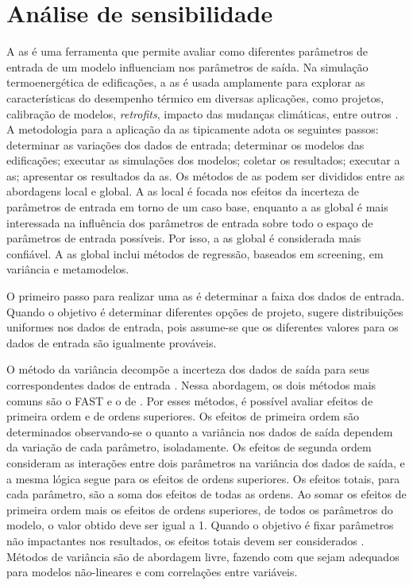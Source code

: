 \documentclass[brazil,hardcopy,openany]{ufscthesis} %
\begin{document}
\section{Análise de sensibilidade}

A \acrfull{as} é uma ferramenta que permite avaliar como diferentes parâmetros de entrada de um modelo influenciam nos parâmetros de saída. Na simulação termoenergética de edificações, a \acrshort{as} é usada amplamente para explorar as características do desempenho térmico em diversas aplicações, como projetos, calibração de modelos, \textit{retrofits}, impacto das mudanças climáticas, entre outros \cite{Tian2013a}. A metodologia para a aplicação da \acrshort{as} tipicamente adota os seguintes passos: determinar as variações dos dados de entrada; determinar os modelos das edificações; executar as simulações dos modelos; coletar os resultados; executar a \acrshort{as}; apresentar os resultados da \acrshort{as}. Os métodos de \acrshort{as} podem ser divididos entre as abordagens local e global. A \acrshort{as} local é focada nos efeitos da incerteza de parâmetros de entrada em torno de um caso base, enquanto a \acrshort{as} global é mais interessada na influência dos parâmetros de entrada sobre todo o espaço de parâmetros de entrada possíveis. Por isso, a \acrshort{as} global é considerada mais confiável. A \acrshort{as} global inclui métodos de regressão, baseados em screening, em variância e metamodelos.

O primeiro passo para realizar uma \acrshort{as} é determinar a faixa dos dados de entrada. Quando o objetivo é determinar diferentes opções de projeto,   sugere distribuições uniformes nos dados de entrada, pois assume-se que os diferentes valores para os dados de entrada são igualmente prováveis.

O método da variância decompõe a incerteza dos dados de saída para seus correspondentes dados de entrada  \cite{Tian2013a}. Nessa abordagem, os dois métodos mais comuns são o FAST \cite{Saltelli2004} e o de . 
Por esses métodos, é possível avaliar efeitos de primeira ordem e de ordens superiores.
Os efeitos de primeira ordem são determinados observando-se o quanto a variância nos dados de saída dependem da variação de cada parâmetro, isoladamente.
Os efeitos de segunda ordem consideram as interações entre dois parâmetros na variância dos dados de saída, e a mesma lógica segue para os efeitos de ordens superiores.
Os efeitos totais, para cada parâmetro, são a soma dos efeitos de todas as ordens.
Ao somar os efeitos de primeira ordem mais os efeitos de ordens superiores, de todos os parâmetros do modelo, o valor obtido deve ser igual a 1.
Quando o objetivo é fixar parâmetros não impactantes nos resultados, os efeitos totais devem ser considerados \cite{Saltelli2004}. Métodos de variância são de abordagem livre, fazendo com que sejam adequados para modelos não-lineares e com correlações entre variáveis.
\end{document}
